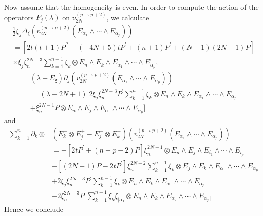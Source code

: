 \documentclass[a4paper,12pt,reqno]{amsart}
\numberwithin{theorem}{subsection}
\numberwithin{equation}{section}
\begin{document}
Now assume that the homogeneity is even. In order to compute the action of the
operators $P_j(\lambda)$ on $v_{2N}^{(p\to  p+2)}$, we calculate
\begin{multline*}
   \tfrac{1}{2} \xi_j \Delta_\xi(v_{2N}^{(p\to p+2)}(E_{\alpha_1}\wedge \cdots \wedge E_{\alpha_p})) \\
   = \left[2t(t\!+\!1)P^{\prime\prime} + (-4N\!+\!5)tP^\prime + (n\!+\!1)P^\prime + (N\!-\!1)(2N\!-\!1)P \right] \\
   \times \xi_j \xi_n^{2N-3}\sum_{k=1}^{n-1}\xi_{k}
   \otimes E_n \wedge E_k \wedge E_{\alpha_1}\wedge\cdots\wedge E_{\alpha_p},
\end{multline*}
\begin{multline*}
   (\lambda-E_\xi)\partial_j(v_{2N}^{(p\to p+2)}(E_{\alpha_1}\wedge \cdots \wedge E_{\alpha_p})) \\
   = (\lambda\!-\!2N\!+\!1) \Big[2\xi_j \xi_n^{2N-3} P^{\prime}
   \sum_{k=1}^{n-1} \xi_{k} \otimes E_n \wedge E_k \wedge E_{\alpha_1} \wedge \cdots \wedge E_{\alpha_p} \\
   +\xi_n^{2N-1}P \otimes E_n \wedge E_j \wedge E_{\alpha_1}\wedge\cdots\wedge E_{\alpha_p}\Big]
\end{multline*}
and
\begin{align*}
   \sum_{k=1}^n \partial_k \otimes & (E^-_k\otimes E^+_j-E_j^-\otimes E_k^+)(v_{2N}^{(p\to p+2)}
   (E_{\alpha_1}\wedge \cdots \wedge E_{\alpha_p}))\\
   & =- \left[2tP^\prime+(n\!-\!p\!-\!2)P\right] \xi_n^{2N-1} \otimes E_n \wedge E_j
   \wedge E_{i_1} \wedge \cdots \wedge E_{i_p}\\
   & - \left[(2N\!-\!1)P-2tP^\prime\right]\xi_n^{2N-2} \sum_{k=1}^{n-1} \xi_{k}
   \otimes E_j \wedge E_k \wedge E_{\alpha_1} \wedge\cdots\wedge E_{\alpha_p}\\
   & + 2\xi_j \xi_n^{2N-3}P^\prime\sum_{k=1}^{n-1} \xi_{k}
   \otimes E_n \wedge E_k \wedge E_{\alpha_1}\wedge\cdots\wedge E_{\alpha_p}\\
   & - 2\xi_n^{2N-3} P^\prime \sum_{k=1}^{n-1} \xi_{k} \xi_{[\alpha_1}
   \otimes E_n \wedge E_k \wedge E_{\alpha_2}\wedge\cdots\wedge E_{\alpha_p]}
\end{align*}
Hence we conclude
\end{document}
